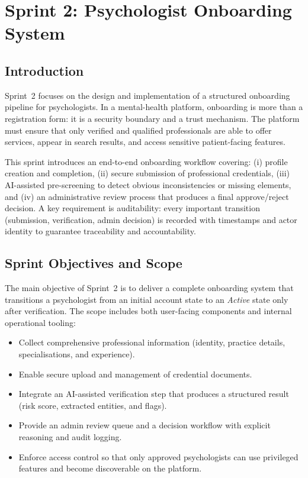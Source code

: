 \chapter{Sprint 2: Psychologist Onboarding System}
\label{chap:sprint2-onboarding}

\section*{Introduction}

Sprint~2 focuses on the design and implementation of a structured onboarding
pipeline for psychologists. In a mental-health platform, onboarding is more
than a registration form: it is a security boundary and a trust mechanism. The
platform must ensure that only verified and qualified professionals are able to
offer services, appear in search results, and access sensitive patient-facing
features.

This sprint introduces an end-to-end onboarding workflow covering: (i) profile
creation and completion, (ii) secure submission of professional credentials,
(iii) AI-assisted pre-screening to detect obvious inconsistencies or missing
elements, and (iv) an administrative review process that produces a final
approve/reject decision. A key requirement is auditability: every important
transition (submission, verification, admin decision) is recorded with
timestamps and actor identity to guarantee traceability and accountability.

\section{Sprint Objectives and Scope}
\label{sec:sprint2-objectives}

The main objective of Sprint~2 is to deliver a complete onboarding system that
transitions a psychologist from an initial account state to an \emph{Active}
state only after verification. The scope includes both user-facing components
and internal operational tooling:

\begin{itemize}
    \item Collect comprehensive professional information (identity, practice
    details, specialisations, and experience).
    \item Enable secure upload and management of credential documents.
    \item Integrate an AI-assisted verification step that produces a structured
    result (risk score, extracted entities, and flags).
    \item Provide an admin review queue and a decision workflow with explicit
    reasoning and audit logging.
    \item Enforce access control so that only approved psychologists can use
    privileged features and become discoverable on the platform.
\end{itemize}

